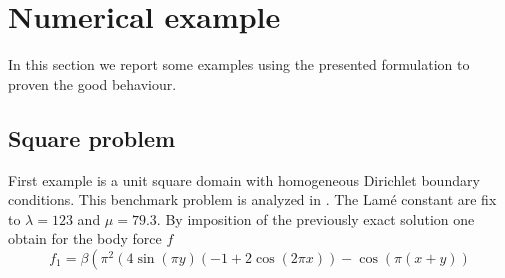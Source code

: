 \documentclass[preprint,12pt,authoryear]{elsarticle}
\begin{document}
\section{Numerical example}\label{sec:five}
In this section we report some examples using the presented formulation to proven the good behaviour. 

\subsection{Square problem}
First example is a unit square domain with homogeneous Dirichlet boundary conditions. This benchmark problem is analyzed in \cite{brenner}.
The Lamé constant are fix to $\lambda = 123$ and $\mu=79.3$.
By imposition of the previously exact solution one obtain for the body force $f$
\begin{equation}
f_{1} = \beta \left(\pi^{2} \left(4\sin\left(\pi y\right)
\left(-1+2\cos\left(2\pi x\right)\right)
-\cos\left(\pi\left(x+y\right)\right) \right.
\end{equation}
\end{document}
